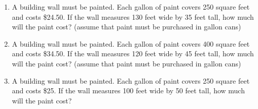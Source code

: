 \begin{enumerate}
\item A building wall must be painted. Each gallon of paint covers 250 square feet and costs \$24.50. If the wall measures 130 feet wide by 35 feet tall, how much will the paint cost? (assume that paint must be purchased in gallon cans)

\item A building wall must be painted. Each gallon of paint covers 400 square feet and costs \$34.50. If the wall measures 120 feet wide by 45 feet tall, how much will the paint cost? (assume that paint must be purchased in gallon cans)

\item A building wall must be painted. Each gallon of paint covers 250 square feet and costs \$25. If the wall measures 100 feet wide by 50 feet tall, how much will the paint cost?

\end{enumerate}
